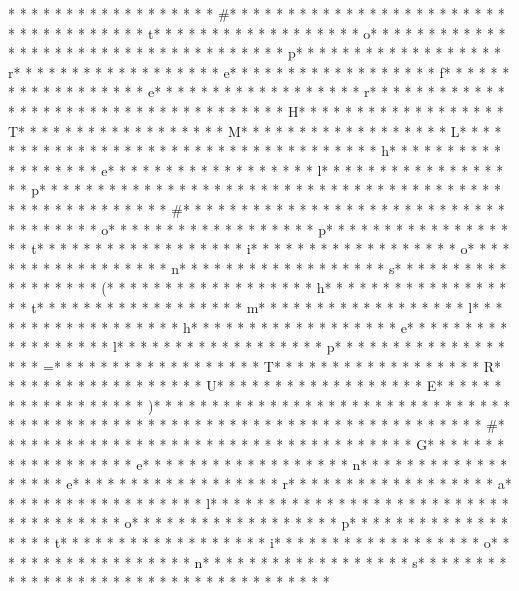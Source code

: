 * * *  * * *  * * *  *  * * *  *  * * *  * #* * *  * * *  * * *  *  * * *  *  * * *  *  * * *  * * *  * * *  *  * * *  *  * * *  * t* * *  * * *  * * *  *  * * *  *  * * *  * o* * *  * * *  * * *  *  * * *  *  * * *  *  * * *  * * *  * * *  *  * * *  *  * * *  * p* * *  * * *  * * *  *  * * *  *  * * *  * r* * *  * * *  * * *  *  * * *  *  * * *  * e* * *  * * *  * * *  *  * * *  *  * * *  * f* * *  * * *  * * *  *  * * *  *  * * *  * e* * *  * * *  * * *  *  * * *  *  * * *  * r* * *  * * *  * * *  *  * * *  *  * * *  *  * * *  * * *  * * *  *  * * *  *  * * *  * H* * *  * * *  * * *  *  * * *  *  * * *  * T* * *  * * *  * * *  *  * * *  *  * * *  * M* * *  * * *  * * *  *  * * *  *  * * *  * L* * *  * * *  * * *  *  * * *  *  * * *  *  * * *  * * *  * * *  *  * * *  *  * * *  * h* * *  * * *  * * *  *  * * *  *  * * *  * e* * *  * * *  * * *  *  * * *  *  * * *  * l* * *  * * *  * * *  *  * * *  *  * * *  * p* * *  * * *  * * *  *  * * *  *  * * *  *  * * *  * * *  * * *  *  * * *  *  * * *  * 
* * *  * * *  * * *  *  * * *  *  * * *  * #* * *  * * *  * * *  *  * * *  *  * * *  *  * * *  * * *  * * *  *  * * *  *  * * *  * o* * *  * * *  * * *  *  * * *  *  * * *  * p* * *  * * *  * * *  *  * * *  *  * * *  * t* * *  * * *  * * *  *  * * *  *  * * *  * i* * *  * * *  * * *  *  * * *  *  * * *  * o* * *  * * *  * * *  *  * * *  *  * * *  * n* * *  * * *  * * *  *  * * *  *  * * *  * s* * *  * * *  * * *  *  * * *  *  * * *  * (* * *  * * *  * * *  *  * * *  *  * * *  * h* * *  * * *  * * *  *  * * *  *  * * *  * t* * *  * * *  * * *  *  * * *  *  * * *  * m* * *  * * *  * * *  *  * * *  *  * * *  * l* * *  * * *  * * *  *  * * *  *  * * *  * h* * *  * * *  * * *  *  * * *  *  * * *  * e* * *  * * *  * * *  *  * * *  *  * * *  * l* * *  * * *  * * *  *  * * *  *  * * *  * p* * *  * * *  * * *  *  * * *  *  * * *  * =* * *  * * *  * * *  *  * * *  *  * * *  * T* * *  * * *  * * *  *  * * *  *  * * *  * R* * *  * * *  * * *  *  * * *  *  * * *  * U* * *  * * *  * * *  *  * * *  *  * * *  * E* * *  * * *  * * *  *  * * *  *  * * *  * )* * *  * * *  * * *  *  * * *  *  * * *  *  * * *  * * *  * * *  *  * * *  *  * * *  * 
* * *  * * *  * * *  *  * * *  *  * * *  * 
* * *  * * *  * * *  *  * * *  *  * * *  * #* * *  * * *  * * *  *  * * *  *  * * *  *  * * *  * * *  * * *  *  * * *  *  * * *  * G* * *  * * *  * * *  *  * * *  *  * * *  * e* * *  * * *  * * *  *  * * *  *  * * *  * n* * *  * * *  * * *  *  * * *  *  * * *  * e* * *  * * *  * * *  *  * * *  *  * * *  * r* * *  * * *  * * *  *  * * *  *  * * *  * a* * *  * * *  * * *  *  * * *  *  * * *  * l* * *  * * *  * * *  *  * * *  *  * * *  *  * * *  * * *  * * *  *  * * *  *  * * *  * o* * *  * * *  * * *  *  * * *  *  * * *  * p* * *  * * *  * * *  *  * * *  *  * * *  * t* * *  * * *  * * *  *  * * *  *  * * *  * i* * *  * * *  * * *  *  * * *  *  * * *  * o* * *  * * *  * * *  *  * * *  *  * * *  * n* * *  * * *  * * *  *  * * *  *  * * *  * s* * *  * * *  * * *  *  * * *  *  * * *  *  * * *  * * *  * * *  *  * * *  *  * * *  * 
